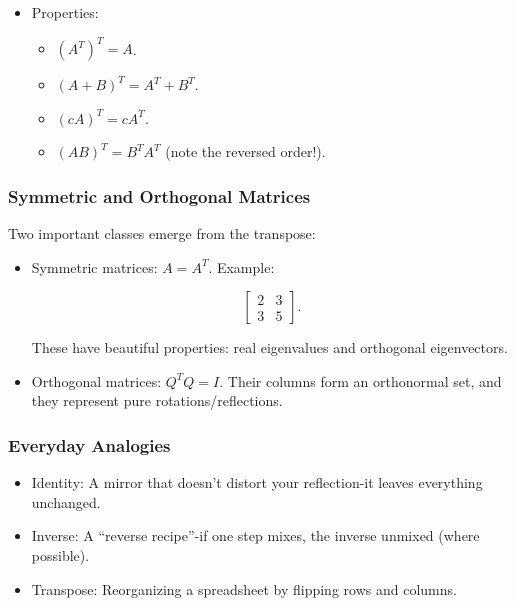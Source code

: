 \documentclass[
  letterpaper,
  DIV=11,
  numbers=noendperiod]{scrreprt}
\providecommand{\tightlist}{%
  \setlength{\itemsep}{0pt}\setlength{\parskip}{0pt}}
\begin{document}
\begin{itemize}
\item
  Properties:

  \begin{itemize}
  \tightlist
  \item
    \((A^T)^T = A\).
  \item
    \((A + B)^T = A^T + B^T\).
  \item
    \((cA)^T = cA^T\).
  \item
    \((AB)^T = B^T A^T\) (note the reversed order!).
  \end{itemize}
\end{itemize}

\subsubsection{Symmetric and Orthogonal
Matrices}\label{symmetric-and-orthogonal-matrices}

Two important classes emerge from the transpose:

\begin{itemize}
\item
  Symmetric matrices: \(A = A^T\). Example:

  \[
  \begin{bmatrix} 
  2 & 3 \\ 
  3 & 5 
  \end{bmatrix}.
  \]

  These have beautiful properties: real eigenvalues and orthogonal
  eigenvectors.
\item
  Orthogonal matrices: \(Q^TQ = I\). Their columns form an orthonormal
  set, and they represent pure rotations/reflections.
\end{itemize}

\subsubsection{Everyday Analogies}\label{everyday-analogies-12}

\begin{itemize}
\tightlist
\item
  Identity: A mirror that doesn't distort your reflection-it leaves
  everything unchanged.
\item
  Inverse: A ``reverse recipe''-if one step mixes, the inverse unmixed
  (where possible).
\item
  Transpose: Reorganizing a spreadsheet by flipping rows and columns.
\end{itemize}
\end{document}
